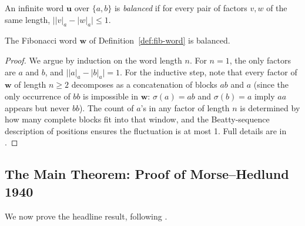 \begin{definition}\label{def:balanced}
  An infinite word \(\mathbf{u}\) over \(\{a,b\}\) is
  \emph{balanced} if for every pair of factors \(v,w\) of the same
  length, \(\bigl||v|_a - |w|_a\bigr|\leq 1\).
\end{definition}

\begin{proposition}\label{prop:fib-balanced}
  The Fibonacci word \(\mathbf{w}\) of Definition~\ref{def:fib-word}
  is balanced.
\end{proposition}
\begin{proof}
  We argue by induction on the word length \(n\).  For \(n=1\), the
  only factors are \(a\) and \(b\), and \(\bigl||a|_a-|b|_a\bigr|=1\).
  For the inductive step, note that every factor of \(\mathbf{w}\) of
  length \(n\geq 2\) decomposes as a concatenation of blocks
  \(ab\) and \(a\) (since the only occurrence of \(bb\) is impossible
  in \(\mathbf{w}\): \(\sigma(a)=ab\) and \(\sigma(b)=a\) imply
  \(aa\) appears but never \(bb\)).  The count of \(a\)'s in any
  factor of length \(n\) is determined by how many complete blocks fit
  into that window, and the Beatty-sequence description of positions
  ensures the fluctuation is at most 1.  Full details are in
  \cite[Prop.~2.1.3]{lothaire2002algebraic}.
\end{proof}

\subsection{The Main Theorem: Proof of Morse--Hedlund 1940}
\label{subsec:ch19-proof-mh}

We now prove the headline result, following
\cite{lothaire2002algebraic,allouche2003automatic}.

